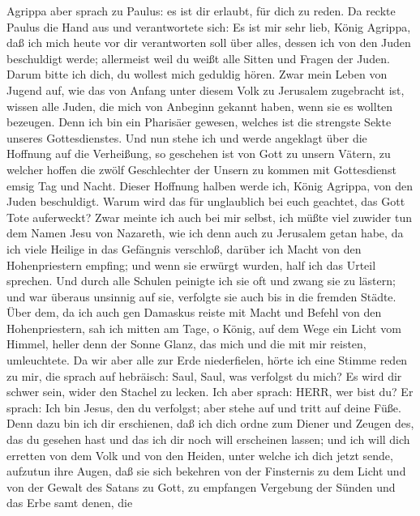  Agrippa aber sprach zu Paulus: es ist dir erlaubt, für dich
zu reden. Da reckte Paulus die Hand aus und verantwortete sich:
 Es ist mir sehr lieb, König Agrippa, daß ich mich heute vor
dir verantworten soll über alles, dessen ich von den Juden beschuldigt
werde;  allermeist weil du weißt alle Sitten und Fragen der
Juden. Darum bitte ich dich, du wollest mich geduldig hören.
 Zwar mein Leben von Jugend auf, wie das von Anfang unter
diesem Volk zu Jerusalem zugebracht ist, wissen alle Juden, 
die mich von Anbeginn gekannt haben, wenn sie es wollten bezeugen. Denn
ich bin ein Pharisäer gewesen, welches ist die strengste Sekte unseres
Gottesdienstes.  Und nun stehe ich und werde angeklagt über
die Hoffnung auf die Verheißung, so geschehen ist von Gott zu unsern
Vätern,  zu welcher hoffen die zwölf Geschlechter der Unsern
zu kommen mit Gottesdienst emsig Tag und Nacht. Dieser Hoffnung halben
werde ich, König Agrippa, von den Juden beschuldigt.  Warum
wird das für unglaublich bei euch geachtet, das Gott Tote auferweckt?
 Zwar meinte ich auch bei mir selbst, ich müßte viel zuwider
tun dem Namen Jesu von Nazareth,  wie ich denn auch zu
Jerusalem getan habe, da ich viele Heilige in das Gefängnis verschloß,
darüber ich Macht von den Hohenpriestern empfing; und wenn sie erwürgt
wurden, half ich das Urteil sprechen.  Und durch alle
Schulen peinigte ich sie oft und zwang sie zu lästern; und war überaus
unsinnig auf sie, verfolgte sie auch bis in die fremden Städte.
 Über dem, da ich auch gen Damaskus reiste mit Macht und
Befehl von den Hohenpriestern,  sah ich mitten am Tage, o
König, auf dem Wege ein Licht vom Himmel, heller denn der Sonne Glanz,
das mich und die mit mir reisten, umleuchtete.  Da wir aber
alle zur Erde niederfielen, hörte ich eine Stimme reden zu mir, die
sprach auf hebräisch: Saul, Saul, was verfolgst du mich? Es wird dir
schwer sein, wider den Stachel zu lecken.  Ich aber sprach:
HERR, wer bist du? Er sprach: Ich bin Jesus, den du verfolgst; aber
stehe auf und tritt auf deine Füße.  Denn dazu bin ich dir
erschienen, daß ich dich ordne zum Diener und Zeugen des, das du gesehen
hast und das ich dir noch will erscheinen lassen;  und ich
will dich erretten von dem Volk und von den Heiden, unter welche ich
dich jetzt sende,  aufzutun ihre Augen, daß sie sich
bekehren von der Finsternis zu dem Licht und von der Gewalt des Satans
zu Gott, zu empfangen Vergebung der Sünden und das Erbe samt denen, die
